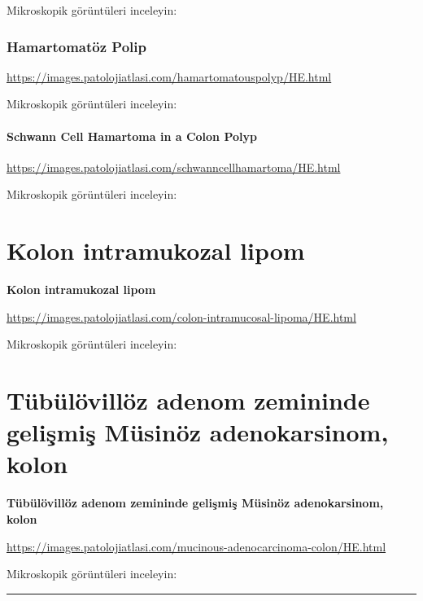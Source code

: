 \documentclass[
  letterpaper,
  DIV=11,
  numbers=noendperiod]{scrreprt}
\begin{document}
Mikroskopik görüntüleri inceleyin:

\hypertarget{hamartomatuxf6z-polip-1}{%
\subsection{Hamartomatöz Polip}\label{hamartomatuxf6z-polip-1}}

\url{https://images.patolojiatlasi.com/hamartomatouspolyp/HE.html}

Mikroskopik görüntüleri inceleyin:

\hypertarget{schwann-cell-hamartoma-in-a-colon-polyp-1}{%
\subsubsection{Schwann Cell Hamartoma in a Colon
Polyp}\label{schwann-cell-hamartoma-in-a-colon-polyp-1}}

\url{https://images.patolojiatlasi.com/schwanncellhamartoma/HE.html}

Mikroskopik görüntüleri inceleyin:

\hypertarget{kolon-intramukozal-lipom}{%
\chapter{Kolon intramukozal lipom}\label{kolon-intramukozal-lipom}}

\textbf{Kolon intramukozal lipom}

\url{https://images.patolojiatlasi.com/colon-intramucosal-lipoma/HE.html}

Mikroskopik görüntüleri inceleyin:

\hypertarget{tuxfcbuxfcluxf6villuxf6z-adenom-zemininde-geliux15fmiux15f-muxfcsinuxf6z-adenokarsinom-kolon}{%
\chapter{Tübülövillöz adenom zemininde gelişmiş Müsinöz adenokarsinom,
kolon}\label{tuxfcbuxfcluxf6villuxf6z-adenom-zemininde-geliux15fmiux15f-muxfcsinuxf6z-adenokarsinom-kolon}}

\textbf{Tübülövillöz adenom zemininde gelişmiş Müsinöz adenokarsinom,
kolon}

\url{https://images.patolojiatlasi.com/mucinous-adenocarcinoma-colon/HE.html}

Mikroskopik görüntüleri inceleyin:

\begin{center}\rule{0.5\linewidth}{0.5pt}\end{center}
\end{document}
